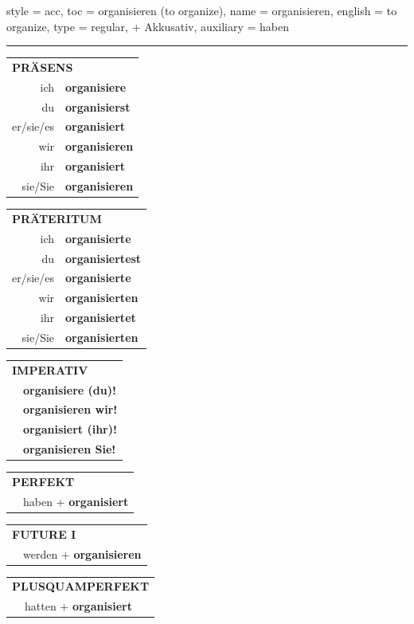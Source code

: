 \begin{verbentry}{
  style = {acc},
  toc = {organisieren (to organize)},
  name = {organisieren},
  english = {to organize},
  type = {regular, + Akkusativ},
  auxiliary = {haben}
}


\vspace{5pt}
\hrule
\vspace{5pt}

\begin{tabular}{rl}
\multicolumn{2}{l}{\textbf{PRÄSENS}}\\
ich & \textbf{organisiere}\\
du & \textbf{organisierst}\\
er/sie/es & \textbf{organisiert}\\
wir & \textbf{organisieren}\\
ihr & \textbf{organisiert}\\
sie/Sie & \textbf{organisieren}\\
\end{tabular}
\hfill
\begin{tabular}{rl}
\multicolumn{2}{l}{\textbf{PRÄTERITUM}}\\
ich & \textbf{organisierte}\\
du & \textbf{organisiertest}\\
er/sie/es & \textbf{organisierte}\\
wir & \textbf{organisierten}\\
ihr & \textbf{organisiertet}\\
sie/Sie & \textbf{organisierten}\\
\end{tabular}
\hfill
\begin{tabular}{rl}
\multicolumn{2}{l}{\textbf{IMPERATIV}}\\
& \textbf{organisiere (du)!}\\
& \textbf{organisieren wir!}\\
& \textbf{organisiert (ihr)!}\\
& \textbf{organisieren Sie!}\\
\end{tabular}

\vspace{10pt}

\begin{tabular}{rl}
\multicolumn{2}{l}{\textbf{PERFEKT}}\\
& haben + \textbf{organisiert}\\
\end{tabular}
\hfill
\begin{tabular}{rl}
\multicolumn{2}{l}{\textbf{FUTURE I}}\\
& werden + \textbf{organisieren}\\
\end{tabular}
\hfill
\begin{tabular}{rl}
\multicolumn{2}{l}{\textbf{PLUSQUAMPERFEKT}}\\
& hatten + \textbf{organisiert}\\
\end{tabular}


\end{verbentry}
